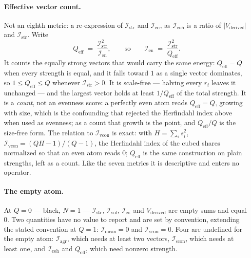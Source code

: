 \documentclass[12pt, a4paper]{article}
\begin{document}
\paragraph{Effective vector count.} Not an eighth metric: a
re-expression of $\mathcal{I}_{\mathrm{str}}$ and $\mathcal{I}_{\mathrm{en}}$, as $\mathcal{I}_{\mathrm{coh}}$ is a ratio of $\lvert V_{\text{derived}}\rvert$ and $\mathcal{I}_{\mathrm{str}}$.
Write
\[
    Q_{\mathrm{eff}} \;=\; \frac{\mathcal{I}_{\mathrm{str}}^{2}}{\mathcal{I}_{\mathrm{en}}},
    \qquad\text{so}\qquad
    \mathcal{I}_{\mathrm{en}} \;=\; \frac{\mathcal{I}_{\mathrm{str}}^{2}}{Q_{\mathrm{eff}}}.
\]
It counts the equally strong vectors that would carry the same
energy: $Q_{\mathrm{eff}}=Q$ when every strength is equal, and it falls
toward $1$ as a single vector dominates, so $1\le Q_{\mathrm{eff}}\le Q$ whenever $\mathcal{I}_{\mathrm{str}}>0$.
It is scale-free --- halving every $r_i$ leaves it unchanged --- and the
largest vector holds at least $1/Q_{\mathrm{eff}}$ of the total
strength. It is a \emph{count}, not an evenness score: a perfectly
even atom reads $Q_{\mathrm{eff}}=Q$, growing with size, which is the
confounding that rejected the Herfindahl index above when used as
evenness; as a count that growth is the point, and
$Q_{\mathrm{eff}}/Q$ is the size-free form. The relation to
$\mathcal{I}_{\mathrm{vcon}}$ is exact: with $H=\sum_i s_i^2$,
$\mathcal{I}_{\mathrm{vcon}}=(QH-1)/(Q-1)$, the Herfindahl index of the cubed
shares normalized so that an even atom reads $0$; $Q_{\mathrm{eff}}$ is
the same construction on plain strengths, left as a count. Like the
seven metrics it is descriptive and enters no operator.

\paragraph{The empty atom.} At $Q=0$ --- black, $N=1$ ---
$\mathcal{I}_{\mathrm{str}}$, $\mathcal{I}_{\mathrm{vol}}$, $\mathcal{I}_{\mathrm{en}}$
and $V_{\text{derived}}$ are empty sums and equal $0$. Two quantities
have no value to report and are set by convention, extending the stated
convention at $Q=1$: $\mathcal{I}_{\mathrm{mean}}=0$ and
$\mathcal{I}_{\mathrm{vcon}}=0$. Four are undefined for the empty atom:
$\mathcal{I}_{\mathrm{agr}}$, which needs at least two vectors,
$\mathcal{I}_{\mathrm{scon}}$, which needs at least one, and
$\mathcal{I}_{\mathrm{coh}}$ and $Q_{\mathrm{eff}}$, which need nonzero strength.
\end{document}
